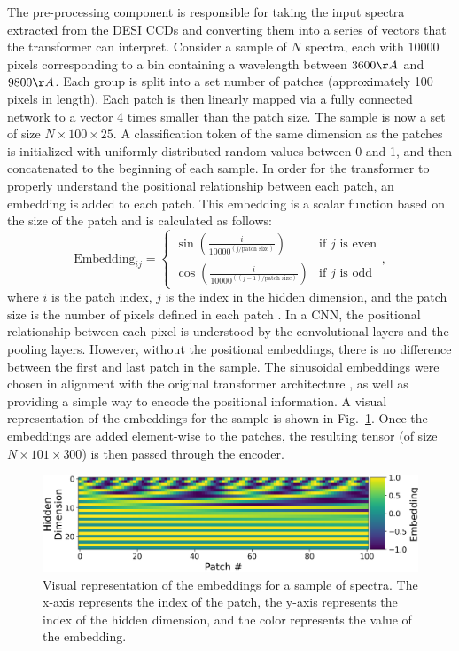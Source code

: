 The pre-processing component is responsible for taking the 
input spectra extracted from the DESI CCDs and converting them into a series of 
vectors that the transformer can interpret. 
Consider a sample of $N$ spectra, each with $10000$ pixels corresponding to a bin containing a wavelength 
between $3600\AA$ and $9800\AA$. Each group is split into a set number of patches 
(approximately 100 pixels in length). Each patch is then 
linearly mapped via a fully connected network to a vector 4 times smaller than the patch size.
The sample is now a set of size $N\times100\times25$. 
A classification token of the same dimension as the patches 
is initialized with uniformly distributed random values between 0 and 1, and then concatenated to the beginning of each sample.
In order for the transformer to properly understand the positional relationship between each patch, an embedding 
is added to each patch. This embedding is a scalar function based on the size 
of the patch and is calculated as follows: 
\begin{equation}
    \text{Embedding}_{ij} = \begin{cases} \sin\left(\frac{i}{10000^{(j / \text{patch size})}}\right) & \text{if } j \text{ is even} \\
    \cos\left(\frac{i}{10000^{((j - 1) / \text{patch size})}}\right) & \text{if } j \text{ is odd}\end{cases},
\end{equation}
where $i$ is the patch index, $j$ is the index in the hidden dimension, and 
the patch size is the number of pixels defined in each patch \parencite{vaswani2017}. 
In a CNN, the positional relationship between each pixel is understood by the convolutional layers
and the pooling layers. However, without the positional embeddings, there is no difference between 
the first and last patch in the sample. The sinusoidal embeddings were chosen in 
alignment with the original transformer architecture \parencite{vaswani2017}, as well 
as providing a simple way to encode the positional information. A visual 
representation of the embeddings for the sample is shown in Fig.~\ref{fig:embedding}. Once the 
embeddings are added element-wise to the patches, the resulting tensor (of size $N\times101\times300$) is then passed through the encoder. 
\begin{figure}[t]
    \centering
    \includegraphics[width=\linewidth]{figures/embeddings_new.png}
    \caption{Visual representation of the embeddings for a sample of spectra. The x-axis represents the 
    index of the patch, the y-axis represents the index of the hidden dimension, and the color represents 
the value of the embedding.}
    \label{fig:embedding}
\end{figure}

